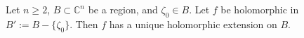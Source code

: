 Let $n \geqslant 2$, $B \subset \mathbb{C}^n$ be a region, and $\zeta_0 \in B$. Let $f$ be holomorphic in $B' := B - \{\zeta_0\}$. Then $f$ has a unique holomorphic extension on $B$.
